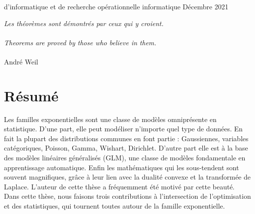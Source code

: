 \documentclass[12pt]{report} %
\numberwithin{equation}{chapter}
\numberwithin{table}{chapter}
\numberwithin{figure}{chapter}
\begin{document}




    {}
    {d'informatique et de recherche op\'{e}rationnelle}
    {informatique}
    {Décembre}
    {2021}

\PagesCouverture
\newpage
 \begin{flushright}
 \emph{Les théorèmes sont démontrés par ceux qui y croient.}\\~\\
 \emph{Theorems are proved by those who believe in them.}  \\~\\
André Weil
 \end{flushright}



\chapter*{Résumé}
Les familles exponentielles sont une classe de modèles omniprésente en statistique.
D'une part, elle  peut modéliser n'importe quel type de données.
En fait la plupart des distributions communes en font partie : Gaussiennes, variables catégoriques, Poisson, Gamma, Wishart, Dirichlet.
D'autre part elle est à la base des modèles linéaires généralisés (GLM), une classe de modèles fondamentale en apprentissage automatique.
Enfin les mathématiques qui les sous-tendent sont souvent magnifiques, grâce à leur lien avec la dualité convexe et la transformée de Laplace.
L'auteur de cette thèse a fréquemment été motivé par cette beauté.
Dans cette thèse, nous faisons trois contributions à l'intersection de l'optimisation et des statistiques, qui tournent toutes autour de la famille exponentielle.
\end{document}
